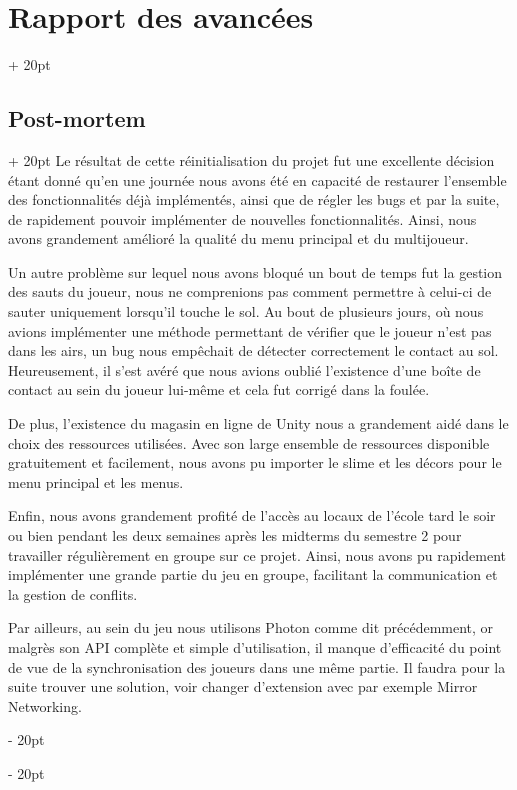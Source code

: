 \documentclass[a4paper, 12pt, twoside]{article}
\newcommand{\ind}[1][20pt]{\advance\leftskip + #1}
\newcommand{\deind}[1][20pt]{\advance\leftskip - #1}
\newenvironment{indt}[2][20pt]{#2 \par \ind[#1]}{\par \deind} %
\begin{document}
\begin{indt}{\section{Rapport des avancées}}
\begin{indt}{\subsection{Post-mortem}}
            Le résultat de cette réinitialisation du projet fut une excellente décision étant donné qu'en une journée nous avons été en capacité de restaurer l'ensemble des fonctionnalités déjà implémentés, ainsi que de régler les bugs et par la suite, de rapidement pouvoir implémenter de nouvelles fonctionnalités. Ainsi, nous avons grandement amélioré la qualité du menu principal et du multijoueur.

            Un autre problème sur lequel nous avons bloqué un bout de temps fut la gestion des sauts du joueur, nous ne comprenions pas comment permettre à celui-ci de sauter uniquement lorsqu'il touche le sol. Au bout de plusieurs jours, où nous avions implémenter une méthode permettant de vérifier que le joueur n'est pas dans les airs, un bug nous empêchait de détecter correctement le contact au sol. Heureusement, il s'est avéré que nous avions oublié l'existence d'une boîte de contact au sein du joueur lui-même et cela fut corrigé dans la foulée.

            De plus, l'existence du magasin en ligne de Unity nous a grandement aidé dans le choix des ressources utilisées. Avec son large ensemble de ressources disponible gratuitement et facilement, nous avons pu importer le slime et les décors pour le menu principal et les menus.

            Enfin, nous avons grandement profité de l'accès au locaux de l'école tard le soir ou bien pendant les deux semaines après les midterms du semestre 2 pour travailler régulièrement en groupe sur ce projet. Ainsi, nous avons pu rapidement implémenter une grande partie du jeu en groupe, facilitant la communication et la gestion de conflits.

            Par ailleurs, au sein du jeu nous utilisons Photon comme dit précédemment, or malgrès son API complète et simple d'utilisation, il manque d'efficacité du point de vue de la synchronisation des joueurs dans une même partie. Il faudra pour la suite trouver une solution, voir changer d'extension avec par exemple Mirror Networking.

        \end{indt}
    \end{indt}

    \newpage
\end{document}
